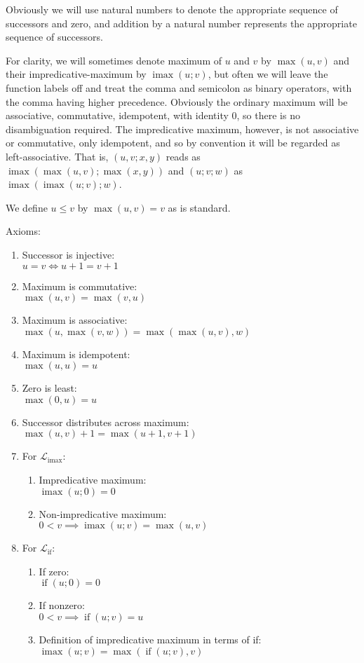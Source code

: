 \documentclass[11pt, twoside, reqno]{book}
\DeclareMathOperator{\imax}{imax}
\DeclareMathOperator{\ifop}{if}
\begin{document}
Obviously we will use natural numbers to denote the appropriate sequence of successors and zero, and addition by a natural number represents the appropriate sequence of successors.

For clarity, we will sometimes denote maximum of \(u\) and \(v\) by \(\max(u, v)\) and their impredicative-maximum by \(\imax(u; v)\), but often we will leave the function labels off and treat the comma and semicolon as binary operators, with the comma having higher precedence.
Obviously the ordinary maximum will be associative, commutative, idempotent, with identity \(0\), so there is no disambiguation required.
The impredicative maximum, however, is not associative or commutative, only idempotent, and so by convention it will be regarded as left-associative.
That is, \((u, v; x, y)\) reads as \(\imax(\max(u, v); \max(x, y))\) and \((u; v; w)\) as \(\imax(\imax(u; v); w)\).

We define \(u \le v\) by \(\max(u, v) = v\) as is standard.

Axioms:
\label{alg-uni-laws}
\begin{enumerate}
\item Successor is injective:\\
  \(u = v \iff u+1 = v+1\)
\item Maximum is commutative:\\
  \(\max(u, v) = \max(v, u)\)
\item Maximum is associative:\\
  \(\max(u, \max(v, w)) = \max(\max(u, v), w)\)
\item Maximum is idempotent:\\
  \(\max(u, u) = u\)
\item Zero is least:\\
  \(\max(0, u) = u\)
\item Successor distributes across maximum:\\
  \(\max(u, v) + 1 = \max(u + 1, v + 1)\)
\item For \(\mathcal{L}_{\imax}\):
\begin{enumerate}
\item Impredicative maximum:\\
  \(\imax(u; 0) = 0\)
\item Non-impredicative maximum:\\
  \(0 < v \implies \imax(u; v) = \max(u, v)\)
\end{enumerate}
\item For \(\mathcal{L}_{\ifop}\):
\begin{enumerate}
\item If zero:\\
  \(\ifop(u; 0) = 0\)
\item If nonzero:\\
  \(0 < v \implies \ifop(u; v) = u\)
\item Definition of impredicative maximum in terms of if:\\
  \(\imax(u; v) = \max(\ifop(u; v), v)\)
\end{enumerate}
\end{enumerate}
\end{document}
